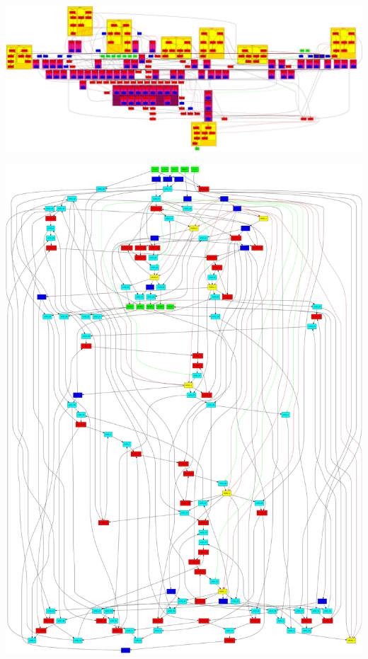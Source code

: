 \documentclass[10pt, compress]{beamer}
\begin{document}
\begin{frame}[standout]
\includegraphics[width=1\textwidth]{images/netlist2_grouped.png}
\end{frame}

\begin{frame}[standout]
\includegraphics[width=1\textwidth]{images/netlist3_replaced.png}
\end{frame}
\end{document}
